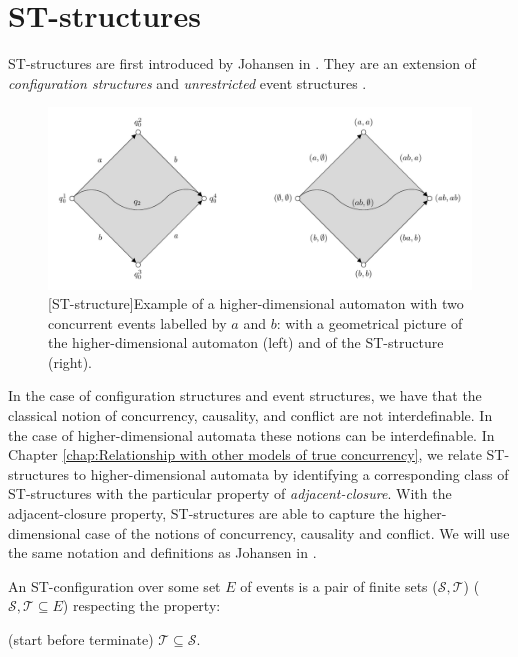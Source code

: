 \section{ST-structures}
\label{sec:ST-structures}
    
    ST-structures are first introduced by Johansen in \cite{Johansen16STstruct}. They are an extension of \emph{configuration structures} \cite{GlabbeekP95config} and \emph{unrestricted} event structures \cite{GlabbeekP09configStruct}. 
    
    \begin{figure}[ht]
        \centering
        \includegraphics[scale=0.9]{master_thesis/Figures/3.An-introduction-to-non-interleaving-models-for-concurrency/ST-structure/st-structure-interleaving-square.pdf}
         [ST-structure]{Example of a higher-dimensional automaton with two concurrent events labelled by $a$ and $b$: with a geometrical picture of the higher-dimensional automaton (left) and of the ST-structure (right).}
        \label{fig:st-structure-interleaving-square}
    \end{figure}
    
    In the case of configuration structures and event structures, we have that the classical notion of concurrency, causality, and conflict are not interdefinable. In the case of higher-dimensional automata these notions can be interdefinable. In Chapter \ref{chap:Relationship with other models of true concurrency}, we relate ST-structures to higher-dimensional automata by identifying a corresponding class of ST-structures with the particular property of \emph{adjacent-closure}. With the adjacent-closure property, ST-structures are able to capture the higher-dimensional case of the notions of concurrency, causality and conflict. We will use the same notation and definitions as Johansen in \cite{Johansen16STstruct}.
    
    \begin{definition}
        \label{def:st-configuration}
        An ST-configuration over some set $E$ of events is a pair of finite sets ($\mathcal{S},\mathcal{T}$) ($\mathcal{S}, \mathcal{T} \subseteq E$) respecting the property:
        
        \begin{center}
            (start before terminate) $\mathcal{T} \subseteq \mathcal{S}$.
        \end{center}
    \end{definition}
    

